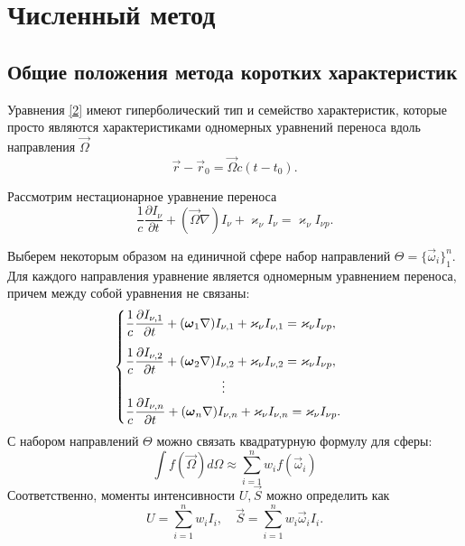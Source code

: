 \chapter{Численный метод}

\section{Общие положения метода коротких характеристик}
Уравнения \eqref{2} имеют гиперболический тип и семейство характеристик, которые просто являются характеристиками одномерных уравнений переноса вдоль направления $\vec\Omega$ 
\begin {equation}
\vec r - \vec r_0 = \vec \Omega c(t-t_0).
\end {equation}

Рассмотрим нестационарное уравнение переноса
\begin {equation}
\frac{1}{c}\frac{\partial I_{\nu}}{\partial t} + (\vec\Omega \nabla) I_{\nu} + \varkappa_\nu I_\nu = \varkappa_{\nu} I_{\nu p}.
\end {equation}

Выберем некоторым образом на единичной сфере набор направлений $\Theta = \{\vec\omega_i\}_1^n$. Для каждого направления уравнение является одномерным уравнением переноса, причем между собой уравнения не связаны:
\begin {equation}
\begin {cases}
\dfrac{1}{c} \dfrac{\partial I_{\nu,1}}{\partial t} + (\vec\omega_1 \nabla) I_{\nu,1} + \varkappa_\nu I_{\nu,1} = \varkappa_{\nu} I_{\nu p}, \\[12pt]
\dfrac{1}{c} \dfrac{\partial I_{\nu,2}}{\partial t} + (\vec\omega_2 \nabla) I_{\nu,2} + \varkappa_\nu I_{\nu,2} = \varkappa_{\nu} I_{\nu p},\\
\hspace{7,65em}\vdots \\
\dfrac{1}{c} \dfrac{\partial I_{\nu,n}}{\partial t} + (\vec\omega_n \nabla) I_{\nu,n} + \varkappa_\nu I_{\nu,n} = \varkappa_{\nu} I_{\nu p}.
\label {8}
\end {cases}
\end {equation}
С набором направлений $\Theta$ можно связать квадратурную формулу для сферы:
\begin {equation}
\int f(\vec\Omega)d\Omega \approx \sum_{i=1}^n w_i f(\vec \omega_i)
\end {equation}
Соответственно, моменты интенсивности $U, \vec S$ можно определить как
\begin {equation}
U = \sum_{i=1}^n w_i I_i, \quad
\vec S = \sum_{i=1}^n w_i \vec \omega_i I_i.
\end {equation}

